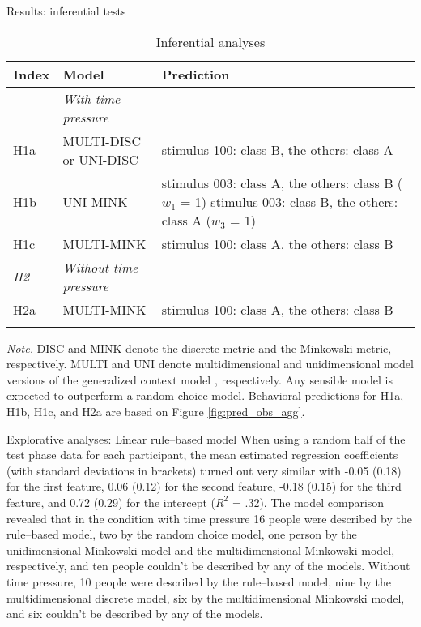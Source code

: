 Results: inferential tests
\begin{sidewaystable}
\begin{center}
\begin{threeparttable}
\caption{Inferential analyses}
\label{tab:inferential}
\begin{tabular*}{\textwidth}{llp{110mm}}
\toprule
\multicolumn{1}{l}{Index} & \multicolumn{1}{l}{Model} & \multicolumn{1}{l}{Prediction}\\
\midrule
\addlinespace
\multicolumn{1}{l}{\emph{H1}} & \multicolumn{1}{l}{\emph{With time pressure}} \\
\addlinespace
H1a & MULTI-DISC or UNI-DISC & stimulus 100: class B, the others: class A\\
\addlinespace
H1b & UNI-MINK & stimulus 003: class A, the others: class B ($w_1$ = 1) \newline stimulus 003: class B, the others: class A ($w_3$ = 1)\\
\addlinespace
H1c & MULTI-MINK & stimulus 100: class A, the others: class B\\
\midrule
\multicolumn{1}{l}{\emph{H2}} & \multicolumn{1}{l}{\emph{Without time pressure}} \\
\addlinespace
H2a & MULTI-MINK & stimulus 100: class A, the others: class B\\
\bottomrule
\addlinespace
\end{tabular*}
\begin{tablenotes}[para]
\textit{Note.} DISC and MINK denote the discrete metric and the Minkowski metric, respectively. MULTI and UNI denote multidimensional and unidimensional model versions of the generalized context model \citep{nosofsky1989further}, respectively. Any sensible model is expected to outperform a random choice model. Behavioral predictions for H1a, H1b, H1c, and H2a are based on Figure \ref{fig:pred_obs_agg}.
\end{tablenotes}
\end{threeparttable}
\end{center}
\end{sidewaystable}

Explorative analyses: Linear rule--based model
When using a random half of the test phase data for each participant, the mean estimated regression coefficients (with standard deviations in brackets) turned out very similar with -0.05 (0.18) for the first feature, 0.06 (0.12) for the second feature, -0.18 (0.15) for the third feature, and 0.72 (0.29) for the intercept ($R^2$ = .32). The model comparison revealed that in the condition with time pressure 16 people were described by the rule--based model, two by the random choice model, one person by the unidimensional Minkowski model and the multidimensional Minkowski model, respectively, and ten people couldn't be described by any of the models. Without time pressure, 10 people were described by the rule--based model, nine by the multidimensional discrete model, six by the multidimensional Minkowski model, and six couldn't be described by any of the models. 

